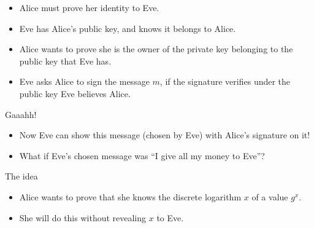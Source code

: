 \begin{frame}
  \begin{example}
    \begin{itemize}
      \item Alice must prove her identity to Eve.

      \item Eve has Alice's public key, and knows it belongs to Alice.

        \pause{}
        
      \item Alice wants to prove she is the owner of the private key belonging 
        to the public key that Eve has.

        \pause{}

      \item Eve asks Alice to sign the message \(m\), if the signature verifies
        under the public key Eve believes Alice.
        
    \end{itemize}
  \end{example}

  \pause{}

  \begin{alertblock}{Gaaahh!}
    \begin{itemize}
      \item Now Eve can show this message (chosen by Eve) with Alice's 
        signature on it!
      \item What if Eve's chosen message was \enquote{I give all my money to 
          Eve}?
    \end{itemize}
  \end{alertblock}
\end{frame}

\begin{frame}
  \begin{block}{The idea}
    \begin{itemize}
      \item Alice wants to prove that she knows the discrete logarithm \(x\) of 
        a value \(g^x\).

      \item She will do this without revealing \(x\) to Eve.
    \end{itemize}
  \end{block}
\end{frame}

